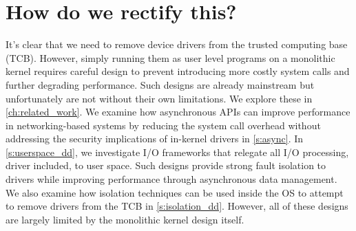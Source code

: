 \section{How do we rectify this?}
It's clear that we need to remove device drivers from the trusted computing base (TCB). However, simply 
running them as user level programs on a monolithic kernel requires careful design to prevent introducing
more costly system calls and further degrading performance. Such designs are already mainstream but unfortunately
are not without their own limitations. We explore these in \autoref{ch:related_work}. We examine how
asynchronous APIs can improve
performance in networking-based systems by reducing the system call overhead without addressing the security
implications of in-kernel drivers in \autoref{s:async}. In \autoref{s:userspace_dd}, we investigate I/O frameworks
that relegate all I/O processing, driver included, to user space. Such designs provide strong fault isolation to
drivers while improving performance through asynchronous data management. 
We also examine how isolation techniques can be used inside the OS to attempt to remove
drivers from the TCB in \autoref{s:isolation_dd}.
However, all of these designs are largely limited by the monolithic kernel design itself.

